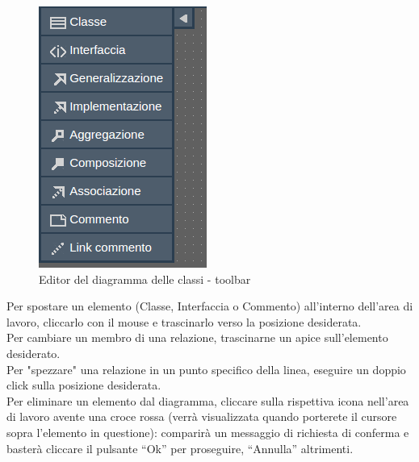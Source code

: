 \documentclass[../ManualeUtente.tex]{subfiles}
\begin{document}
				\begin{figure} [h!]
					\centering
					\includegraphics[scale=0.4]{./Immagini/ToolbarClDiag.png}
					\caption{Editor del diagramma delle classi - toolbar}\label{fig:ToolbarClDiag}
				\end{figure}
				Per spostare un elemento (Classe, Interfaccia o Commento) all'interno dell'area di lavoro,
				cliccarlo con il mouse e trascinarlo verso la posizione desiderata.\\
				Per cambiare un membro di una relazione, trascinarne un apice sull'elemento
				desiderato.\\
				Per "spezzare" una relazione in un punto specifico della linea, eseguire un doppio click sulla
				posizione desiderata.\\
				Per eliminare un elemento dal diagramma, cliccare sulla rispettiva icona nell'area di lavoro
				avente una croce rossa (verrà visualizzata quando porterete il cursore sopra l'elemento in questione):
				comparirà un messaggio di richiesta di conferma e basterà cliccare il pulsante ``Ok'' per proseguire,
				``Annulla'' altrimenti.
\end{document}
